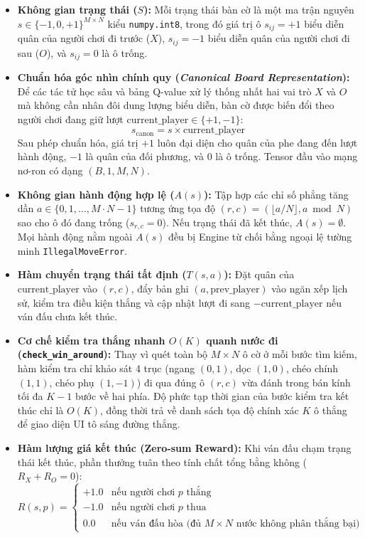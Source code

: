 \documentclass[a4paper,12pt]{report}
\begin{document}
\begin{itemize}[leftmargin=1.2cm]
    \item \textbf{Không gian trạng thái ($S$):} Mỗi trạng thái bàn cờ là một ma trận nguyên $s \in \{-1, 0, +1\}^{M \times N}$ kiểu \texttt{numpy.int8}, trong đó giá trị ô $s_{ij} = +1$ biểu diễn quân của người chơi đi trước ($X$), $s_{ij} = -1$ biểu diễn quân của người chơi đi sau ($O$), và $s_{ij} = 0$ là ô trống.
    \item \textbf{Chuẩn hóa góc nhìn chính quy (\textit{Canonical Board Representation}):} Để các tác tử học sâu và bảng Q-value xử lý thống nhất hai vai trò $X$ và $O$ mà không cần nhân đôi dung lượng biểu diễn, bàn cờ được biến đổi theo người chơi đang giữ lượt $\text{current\_player} \in \{+1, -1\}$:
    \begin{equation}
        s_{\text{canon}} = s \times \text{current\_player}
    \end{equation}
    Sau phép chuẩn hóa, giá trị $+1$ luôn đại diện cho quân của phe đang đến lượt hành động, $-1$ là quân của đối phương, và $0$ là ô trống. Tensor đầu vào mạng nơ-ron có dạng $(B, 1, M, N)$.
    \item \textbf{Không gian hành động hợp lệ ($A(s)$):} Tập hợp các chỉ số phẳng tăng dần $a \in \{0, 1, \dots, M \cdot N - 1\}$ tương ứng tọa độ $(r, c) = (\lfloor a / N \rfloor, a \bmod N)$ sao cho ô đó đang trống ($s_{r,c} = 0$). Nếu trạng thái đã kết thúc, $A(s) = \emptyset$. Mọi hành động nằm ngoài $A(s)$ đều bị Engine từ chối bằng ngoại lệ tường minh \texttt{IllegalMoveError}.
    \item \textbf{Hàm chuyển trạng thái tất định ($T(s, a)$):} Đặt quân của $\text{current\_player}$ vào $(r, c)$, đẩy bản ghi $(a, \text{prev\_player})$ vào ngăn xếp lịch sử, kiểm tra điều kiện thắng và cập nhật lượt đi sang $-\text{current\_player}$ nếu ván đấu chưa kết thúc.
    \item \textbf{Cơ chế kiểm tra thắng nhanh $O(K)$ quanh nước đi (\texttt{check\_\allowbreak win\_\allowbreak around}):} Thay vì quét toàn bộ $M \times N$ ô cờ ở mỗi bước tìm kiếm, hàm kiểm tra chỉ khảo sát 4 trục (ngang $(0,1)$, dọc $(1,0)$, chéo chính $(1,1)$, chéo phụ $(1,-1)$) đi qua đúng ô $(r, c)$ vừa đánh trong bán kính tối đa $K - 1$ bước về hai phía. Độ phức tạp thời gian của bước kiểm tra kết thúc chỉ là $O(K)$, đồng thời trả về danh sách tọa độ chính xác $K$ ô thắng để giao diện UI tô sáng đường thắng.
    \item \textbf{Hàm lượng giá kết thúc (Zero-sum Reward):} Khi ván đấu chạm trạng thái kết thúc, phần thưởng tuân theo tính chất tổng bằng không ($R_X + R_O = 0$):
    \begin{equation}
        R(s, p) = \begin{cases}
            +1.0 & \text{nếu người chơi } p \text{ thắng} \\
            -1.0 & \text{nếu người chơi } p \text{ thua} \\
            0.0 & \text{nếu ván đấu hòa (đủ } M \times N \text{ nước không phân thắng bại)}
        \end{cases}
    \end{equation}
\end{itemize}
\end{document}
